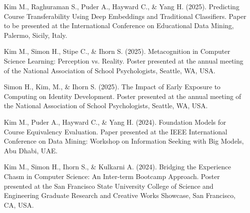 \documentclass[hidelinks, 10pt]{article}
\def\contentwidth{0.9\linewidth}    %
\def\contentblockspacing{2.5mm}     %
\def\sectionspacing{8mm}            %
\begin{document}
{\begin{minipage}[ct]{\contentwidth}
    Kim M., Raghuraman S., Puder A., Hayward C., \& Yang H. (2025). Predicting Course Transferability Using Deep Embeddings and Traditional
    Classifiers. Paper to be presented at the International Conference on Educational Data Mining, Palermo, Sicily, Italy.
\end{minipage}

\vspace{\contentblockspacing}

\begin{minipage}[ct]{\contentwidth}
    Kim M., Simon H., Stipe C., \& Ihorn S. (2025). Metacognition in Computer Science Learning: Perception vs. Reality. Poster presented at
    the annual meeting of the National Association of School Psychologists, Seattle, WA, USA.
\end{minipage}

\vspace{\contentblockspacing}

\begin{minipage}[ct]{\contentwidth}
    Simon H., Kim, M., \& Ihorn S. (2025). The Impact of Early Exposure to Computing on Identity Development. Poster presented at the annual
    meeting of the National Association of School Psychologists, Seattle, WA, USA.
\end{minipage}

\vspace{\contentblockspacing}

\begin{minipage}[ct]{\contentwidth}
    Kim M., Puder A., Hayward C., \& Yang H. (2024). Foundation Models for Course Equivalency Evaluation. Paper presented at the IEEE
    International Conference on Data Mining: Workshop on Information Seeking with Big Models, Abu Dhabi, UAE.
\end{minipage}

\vspace{\contentblockspacing}

\begin{minipage}[ct]{\contentwidth}
    Kim M., Simon H., Ihorn S., \& Kulkarni A. (2024). Bridging the Experience Chasm in Computer Science: An Inter-term Bootcamp Approach.
    Poster presented at the San Francisco State University College of Science and Engineering Graduate Research and Creative Works Showcase,
    San Francisco, CA, USA.
\end{minipage}

\vspace{\sectionspacing}

}
\end{document}
